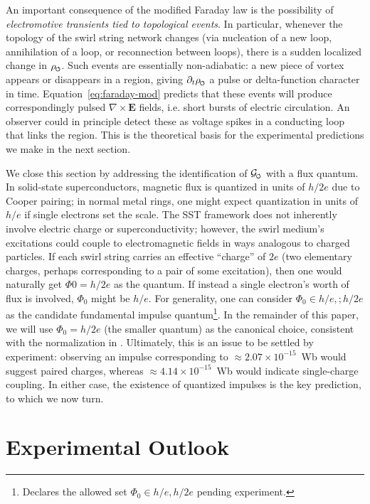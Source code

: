 \documentclass[12pt]{article}
\DeclareRobustCommand{\swirlarrow}{
\mathchoice{\mkern-2mu\scriptstyle\boldsymbol{\circlearrowleft}}%
{\mkern-2mu\scriptstyle\boldsymbol{\circlearrowleft}}%
{\mkern-2mu\scriptscriptstyle\boldsymbol{\circlearrowleft}}%
{\mkern-2mu\scriptscriptstyle\boldsymbol{\circlearrowleft}}
}%
\newcommand{\Gswirl}{\mathcal{G}_{\swirlarrow}}
\begin{document}
An important consequence of the modified Faraday law is the possibility of \emph{electromotive transients tied to topological events}. In particular, whenever the topology of the swirl string network changes (via nucleation of a new loop, annihilation of a loop, or reconnection between loops), there is a sudden localized change in $\rho_{\swirlarrow}$. Such events are essentially non-adiabatic: a new piece of vortex appears or disappears in a region, giving $\partial_t \rho_{\swirlarrow}$ a pulse or delta-function character in time. Equation~\eqref{eq:faraday-mod} predicts that these events will produce correspondingly pulsed $\nabla \times \mathbf{E}$ fields, i.e. short bursts of electric circulation. An observer could in principle detect these as voltage spikes in a conducting loop that links the region. This is the theoretical basis for the experimental predictions we make in the next section.


We close this section by addressing the identification of $\Gswirl$ with a flux quantum. In solid-state superconductors, magnetic flux is quantized in units of $h/2e$ due to Cooper pairing; in normal metal rings, one might expect quantization in units of $h/e$ if single electrons set the scale. The SST framework does not inherently involve electric charge or superconductivity; however, the swirl medium's excitations could couple to electromagnetic fields in ways analogous to charged particles. If each swirl string carries an effective ``charge'' of $2e$ (two elementary charges, perhaps corresponding to a pair of some excitation), then one would naturally get $\Phi{0}=h/2e$ as the quantum. If instead a single electron's worth of flux is involved, $\Phi_{0}$ might be $h/e$. For generality, one can consider $\Phi_{0}\in{h/e,;h/2e}$ as the candidate fundamental impulse quantum\footnote{Declares the allowed set $\Phi_0\in{h/e,h/2e}$ pending experiment.}. In the remainder of this paper, we will use $\Phi_{0}=h/2e$ (the smaller quantum) as the canonical choice, consistent with the normalization in \cite{Iskandarani2025RotatingFrame}. Ultimately, this is an issue to be settled by experiment: observing an impulse corresponding to $\approx2.07\times10^{-15}$~Wb would suggest paired charges, whereas $\approx4.14\times10^{-15}$~Wb would indicate single-charge coupling. In either case, the existence of quantized impulses is the key prediction, to which we now turn.


\section{Experimental Outlook}\label{sec:experimental}
\end{document}
